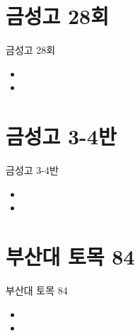 \documentclass[aspectratio=1610,17pt,xcolor=pdftex,dvipsnames,table,handout]{beamer}
\begin{document}
		
				
		
		\section{금성고 28회}
		

		\begin{frame} [t,plain]
			\begin{block} {금성고 28회}
			\begin{itemize}
				\item 
				\item 
			\end{itemize}
			\end{block}
		\end{frame}

		\section{금성고 3-4반}
		

		\begin{frame} [t,plain]
			\begin{block} {금성고 3-4반}
			\begin{itemize}
				\item 
				\item 
			\end{itemize}
			\end{block}
		\end{frame}

		\section{부산대 토목 84}
		

		\begin{frame} [t,plain]
			\begin{block} {부산대 토목 84}
			\begin{itemize}
				\item 
				\item 
			\end{itemize}
			\end{block}
		\end{frame}
\end{document}
